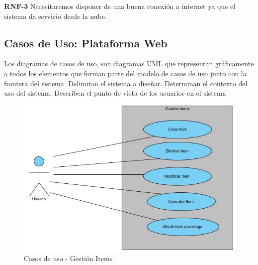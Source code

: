 \documentclass[a4paper,11pt]{book}
\begin{document}
\textbf{RNF-3} Necesitaremos disponer de una buena conexión a internet ya que el sistema da servicio desde la nube. 



\subsection{Casos de Uso: Plataforma Web}

Los diagramas de casos de uso, son diagramas UML que representan gráficamente a todos los elementos que forman parte del modelo de casos de uso junto con la frontera del sistema. Delimitan el sistema a diseñar. Determinan el contexto del uso del sistema. Describen el punto de vista de los usuarios  en el sistema 

\begin{figure}[htbpH]  
\centering 
\includegraphics[scale=0.50]{imagenes/casosUso/gestionItem.jpg}
\caption{ Casos de uso - Gestión Items  }  
\end{figure}
\end{document}
